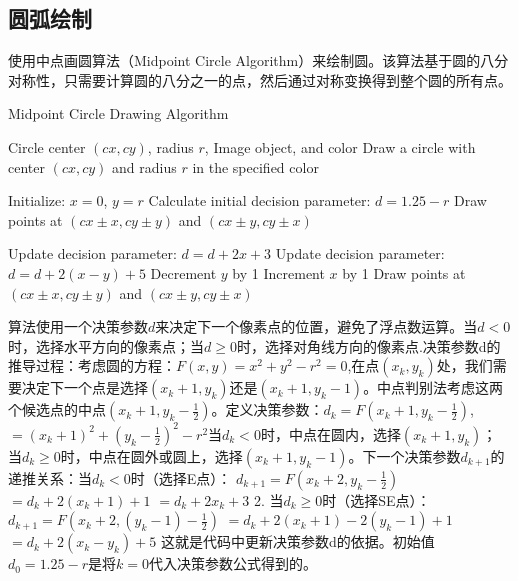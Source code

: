 \documentclass[a4paper,twoside]{article}
\begin{document}
\subsection{圆弧绘制}
使用中点画圆算法（Midpoint Circle Algorithm）来绘制圆。该算法基于圆的八分对称性，只需要计算圆的八分之一的点，然后通过对称变换得到整个圆的所有点。
\begin{algorithm}[H]
    \caption{Midpoint Circle Drawing Algorithm}
    \label{alg:midpoint_circle}
    \begin{algorithmic}[1]
        \REQUIRE Circle center $(cx, cy)$, radius $r$, Image object, and color
        \ENSURE Draw a circle with center $(cx, cy)$ and radius $r$ in the specified color

        \STATE Initialize: $x = 0$, $y = r$
        \STATE Calculate initial decision parameter: $d = 1.25 - r$
        \STATE Draw points at $(cx \pm x, cy \pm y)$ and $(cx \pm y, cy \pm x)$
        
                \STATE Update decision parameter: $d = d + 2x + 3$
            \ELSE
                \STATE Update decision parameter: $d = d + 2(x - y) + 5$
                \STATE Decrement $y$ by 1
            \ENDIF
            \STATE Increment $x$ by 1
            \STATE Draw points at $(cx \pm x, cy \pm y)$ and $(cx \pm y, cy \pm x)$
        \ENDWHILE
    \end{algorithmic}
\end{algorithm}
算法使用一个决策参数$d$来决定下一个像素点的位置，避免了浮点数运算。当$d < 0$时，选择水平方向的像素点；当$d \geq 0$时，选择对角线方向的像素点.决策参数d的推导过程：考虑圆的方程：$F(x,y) = x^2 + y^2 - r^2 = 0$,在点$(x_k, y_k)$处，我们需要决定下一个点是选择$(x_k+1, y_k)$还是$(x_k+1, y_k-1)$。中点判别法考虑这两个候选点的中点$(x_k+1, y_k-\frac{1}{2})$。定义决策参数：$d_k = F(x_k+1, y_k-\frac{1}{2})$,$= (x_k+1)^2 + (y_k-\frac{1}{2})^2 - r^2$当$d_k < 0$时，中点在圆内，选择$(x_k+1, y_k)$；
当$d_k \geq 0$时，中点在圆外或圆上，选择$(x_k+1, y_k-1)$。下一个决策参数$d_{k+1}$的递推关系：当$d_k < 0$时（选择E点）：
   $d_{k+1} = F(x_k+2, y_k-\frac{1}{2})$
   $= d_k + 2(x_k+1) + 1$
   $= d_k + 2x_k + 3$
2. 当$d_k \geq 0$时（选择SE点）：
   $d_{k+1} = F(x_k+2, (y_k-1)-\frac{1}{2})$
   $= d_k + 2(x_k+1) - 2(y_k-1) + 1$
   $= d_k + 2(x_k - y_k) + 5$
这就是代码中更新决策参数d的依据。初始值$d_0 = 1.25 - r$是将$k=0$代入决策参数公式得到的。
\end{document}
